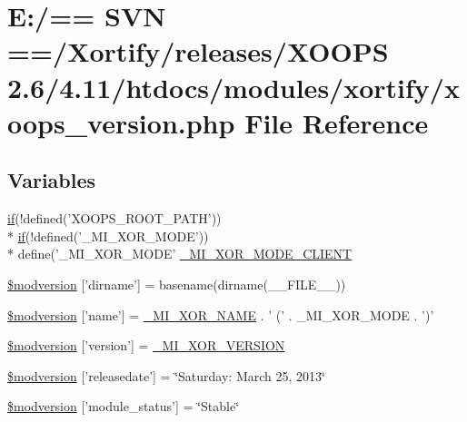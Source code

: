 \hypertarget{xoops__version_8php}{\section{E\-:/== S\-V\-N ==/\-Xortify/releases/\-X\-O\-O\-P\-S 2.6/4.11/htdocs/modules/xortify/xoops\-\_\-version.php File Reference}
\label{xoops__version_8php}
}
\subsection*{Variables}
\begin{DoxyCompactItemize}
\item 
\hyperlink{poll_2index_8php_ae404acbb304be6b6ac443de921697faf}{if}(!defined('X\-O\-O\-P\-S\-\_\-\-R\-O\-O\-T\-\_\-\-P\-A\-T\-H')) \\*
\hyperlink{poll_2index_8php_ae404acbb304be6b6ac443de921697faf}{if}(!defined('\-\_\-\-M\-I\-\_\-\-X\-O\-R\-\_\-\-M\-O\-D\-E')) \\*
define('\-\_\-\-M\-I\-\_\-\-X\-O\-R\-\_\-\-M\-O\-D\-E' \hyperlink{xoops__version_8php_a9075115f6fe06eab2978b952478e2bfd}{\-\_\-\-M\-I\-\_\-\-X\-O\-R\-\_\-\-M\-O\-D\-E\-\_\-\-C\-L\-I\-E\-N\-T}
\item 
\hyperlink{xoops__version_8php_a39d2d4621e3065109051fa95e5ea69d9}{\$modversion} \mbox{[}'dirname'\mbox{]} = basename(dirname(\-\_\-\-\_\-\-F\-I\-L\-E\-\_\-\-\_\-))
\item 
\hyperlink{xoops__version_8php_a5cdbd2ac9e212ff077aaa59101b3b867}{\$modversion} \mbox{[}'name'\mbox{]} = \hyperlink{modinfo_8php_afe39b9c3642badcfa14b81da4dc0bae0}{\-\_\-\-M\-I\-\_\-\-X\-O\-R\-\_\-\-N\-A\-M\-E} . ' (' . \-\_\-\-M\-I\-\_\-\-X\-O\-R\-\_\-\-M\-O\-D\-E . ')'
\item 
\hyperlink{xoops__version_8php_acca90d0d682b0eb029fdaad38ff16570}{\$modversion} \mbox{[}'version'\mbox{]} = \hyperlink{modinfo_8php_add6d8e7c954748f79afe91685be8f333}{\-\_\-\-M\-I\-\_\-\-X\-O\-R\-\_\-\-V\-E\-R\-S\-I\-O\-N}
\item 
\hyperlink{xoops__version_8php_a0155196723a439a1c9c63166d75e1aa9}{\$modversion} \mbox{[}'releasedate'\mbox{]} = \char`\"{}Saturday\-: March 25, 2013\char`\"{}
\item 
\hyperlink{xoops__version_8php_a9a8b63ec3546bbd06789015d8d641444}{\$modversion} \mbox{[}'module\-\_\-status'\mbox{]} = \char`\"{}Stable\char`\"{}

\end{DoxyCompactItemize}

